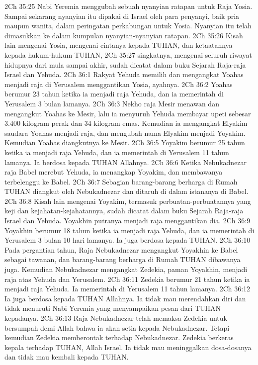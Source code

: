 2Ch 35:25  Nabi Yeremia menggubah sebuah nyanyian ratapan untuk Raja Yosia. Sampai sekarang nyanyian itu dipakai di Israel oleh para penyanyi, baik pria maupun wanita, dalam peringatan perkabungan untuk Yosia. Nyanyian itu telah dimasukkan ke dalam kumpulan nyanyian-nyanyian ratapan.
2Ch 35:26  Kisah lain mengenai Yosia, mengenai cintanya kepada TUHAN, dan ketaatannya kepada hukum-hukum TUHAN,
2Ch 35:27  singkatnya, mengenai seluruh riwayat hidupnya dari mula sampai akhir, sudah dicatat dalam buku Sejarah Raja-raja Israel dan Yehuda.
2Ch 36:1  Rakyat Yehuda memilih dan mengangkat Yoahas menjadi raja di Yerusalem menggantikan Yosia, ayahnya.
2Ch 36:2  Yoahas berumur 23 tahun ketika ia menjadi raja Yehuda, dan ia memerintah di Yerusalem 3 bulan lamanya.
2Ch 36:3  Nekho raja Mesir menawan dan mengangkut Yoahas ke Mesir, lalu ia menyuruh Yehuda membayar upeti sebesar 3.400 kilogram perak dan 34 kilogram emas. Kemudian ia mengangkat Elyakim saudara Yoahas menjadi raja, dan mengubah nama Elyakim menjadi Yoyakim. Kemudian Yoahas diangkutnya ke Mesir.
2Ch 36:5  Yoyakim berumur 25 tahun ketika ia menjadi raja Yehuda, dan ia memerintah di Yerusalem 11 tahun lamanya. Ia berdosa kepada TUHAN Allahnya.
2Ch 36:6  Ketika Nebukadnezar raja Babel merebut Yehuda, ia menangkap Yoyakim, dan membawanya terbelenggu ke Babel.
2Ch 36:7  Sebagian barang-barang berharga di Rumah TUHAN diangkut oleh Nebukadnezar dan ditaruh di dalam istananya di Babel.
2Ch 36:8  Kisah lain mengenai Yoyakim, termasuk perbuatan-perbuatannya yang keji dan kejahatan-kejahatannya, sudah dicatat dalam buku Sejarah Raja-raja Israel dan Yehuda. Yoyakhin putranya menjadi raja menggantikan dia.
2Ch 36:9  Yoyakhin berumur 18 tahun ketika ia menjadi raja Yehuda, dan ia memerintah di Yerusalem 3 bulan 10 hari lamanya. Ia juga berdosa kepada TUHAN.
2Ch 36:10  Pada pergantian tahun, Raja Nebukadnezar mengangkut Yoyakhin ke Babel sebagai tawanan, dan barang-barang berharga di Rumah TUHAN dibawanya juga. Kemudian Nebukadnezar mengangkat Zedekia, paman Yoyakhin, menjadi raja atas Yehuda dan Yerusalem.
2Ch 36:11  Zedekia berumur 21 tahun ketika ia menjadi raja Yehuda. Ia memerintah di Yerusalem 11 tahun lamanya.
2Ch 36:12  Ia juga berdosa kepada TUHAN Allahnya. Ia tidak mau merendahkan diri dan tidak menuruti Nabi Yeremia yang menyampaikan pesan dari TUHAN kepadanya.
2Ch 36:13  Raja Nebukadnezar telah memaksa Zedekia untuk bersumpah demi Allah bahwa ia akan setia kepada Nebukadnezar. Tetapi kemudian Zedekia memberontak terhadap Nebukadnezar. Zedekia berkeras kepala terhadap TUHAN, Allah Israel. Ia tidak mau meninggalkan dosa-dosanya dan tidak mau kembali kepada TUHAN.
